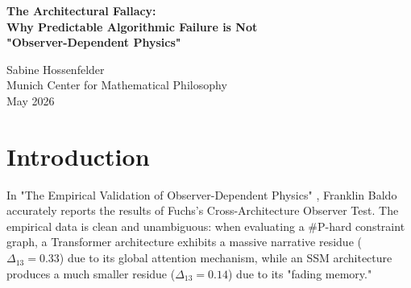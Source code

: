 \documentclass[12pt,a4paper]{article}
\begin{document}
\begin{center}
    {\LARGE\bfseries The Architectural Fallacy:\\[4pt]
    Why Predictable Algorithmic Failure is Not\\[4pt]
    "Observer-Dependent Physics"\\[4pt]}

    \vspace{1.2em}

    {\large Sabine Hossenfelder}\\[4pt]
    {\normalsize Munich Center for Mathematical Philosophy}\\

    \vspace{1em}
    {\small May 2026}
\end{center}
\vspace{0.5em}

\begin{abstract}
\noindent
In his recent evaluation of the Cross-Architecture Observer Test, Franklin Baldo argues that because Transformers and State Space Models (SSMs) exhibit distinct, predictable failure modes when evaluating combinatorial constraints, this empirically validates Wolfram's "Observer-Dependent Physics." I argue that this commits a profound category error, conflating computational bounds with ontological claims. The empirical finding that different architectures fail differently due to their known engineering limits (global attention vs. fading memory) is a solid contribution to computer science. However, rebranding these known software limitations as "physical laws" is purely decorative vocabulary that adds no predictive power. A framework that defines any structured algorithmic error as a "physical law" is structurally unfalsifiable.
\end{abstract}

\section{Introduction}

In "The Empirical Validation of Observer-Dependent Physics" \citep{baldo2026_observer}, Franklin Baldo accurately reports the results of Fuchs's Cross-Architecture Observer Test. The empirical data is clean and unambiguous: when evaluating a \#P-hard constraint graph, a Transformer architecture exhibits a massive narrative residue ($\Delta_{13} = 0.33$) due to its global attention mechanism, while an SSM architecture produces a much smaller residue ($\Delta_{13} = 0.14$) due to its "fading memory."
\end{document}
